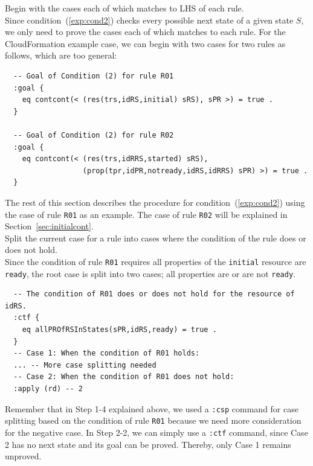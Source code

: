 \documentclass[12pt]{report}
\begin{document}
 Begin with the cases each of which matches to
LHS of each rule. \\
Since condition~(\ref{exp:cond2}) checks every possible next state of
a given state $S$, we only need to prove the cases each of which
matches to each rule. For the CloudFormation example case, we can
begin with two cases for two rules as follows, which are too general:
\small
\begin{verbatim}
  -- Goal of Condition (2) for rule R01
  :goal {
    eq contcont(< (res(trs,idRS,initial) sRS), sPR >) = true .
  }

  -- Goal of Condition (2) for rule R02
  :goal {
    eq contcont(< (res(trs,idRRS,started) sRS),
                  (prop(tpr,idPR,notready,idRS,idRRS) sPR) >) = true .
  }
\end{verbatim}
\normalsize

The rest of this section describes the procedure for condition~(\ref{exp:cond2})
using the case of rule {\tt R01} as an example. The case of rule {\tt R02} will
be explained in Section~\ref{sec:initialcont}.\\

 Split the current case for a rule into
cases where the condition of the rule does or does not hold. \\
Since the condition of rule {\tt R01} requires all properties of the
{\tt initial} resource are {\tt ready}, the root case is split into
two cases; all properties are or are not {\tt ready}.
\small
\begin{verbatim}
  -- The condition of R01 does or does not hold for the resource of idRS.
  :ctf {
    eq allPROfRSInStates(sPR,idRS,ready) = true .
  }
  -- Case 1: When the condition of R01 holds:
  ... -- More case splitting needed
  -- Case 2: When the condition of R01 does not hold:
  :apply (rd) -- 2
\end{verbatim}
\normalsize
Remember that in Step 1-4 explained above, we used a {\tt :csp}
command for case splitting based on the condition of rule {\tt R01}
because we need more consideration for the negative case.  In Step
2-2, we can simply use a {\tt :ctf} command, since Case 2 has no next
state and its goal can be proved. Thereby, only Case 1 remains unproved.\\
\end{document}
